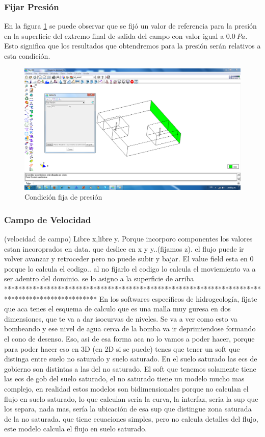 \documentclass[10pt,a4paper,final]{article}
\begin{document}
\subsubsection*{Fijar Presión}
En la figura \ref{datos_condiciones_ransol_presion} se puede observar que se fijó un valor de referencia para la presión en la superficie del extremo final de salida del campo con valor igual a $0.0~Pa$. Esto significa que los resultados que obtendremos para la presión serán relativos a esta condición.

\begin{figure}[tbhp]
\centerline{\includegraphics[scale=0.75]{img/datos_condiciones_ransol_presion}}
\caption{Condición fija de presión}
\label{datos_condiciones_ransol_presion}
\end{figure}

\subsubsection*{Campo de Velocidad}

(velocidad de campo) Libre x,libre y. Porque incorporo componentes los valores estan incoroprados en data.
que deslice en x y y..(fijamos z).
el flujo puede ir volver avanzar y retroceder pero no puede subir y bajar. El value field esta en 0 porque lo calcula el codigo.. al no fijarlo el codigo lo calcula
el moviemiento va a ser adentro del dominio. se lo asigno  a la superficie de arriba
**************************************************************************************************
En los softwares específicos de hidrogeología, fijate que aca tenes el esquema de calculo que es una malla muy guresa en dos dimensiones, que te va a dar isocurvas de niveles. Se va a ver como esto va bombeando y ese nivel de agua cerca de la bomba va ir deprimiendose formando el cono de desenso. Eso, asi de esa forma aca no lo vamos a poder hacer, porque para poder hacer eso en 3D (en 2D si se puede) tenes que tener un soft que distinga entre suelo no saturado y suelo saturado. En el suelo saturado las ecs de gobierno son distintas a las del no saturado. El soft que tenemos solamente tiene las ecs de gob del suelo saturado, el no saturado tiene un modelo mucho mas complejo, en realidad estos modelos son bidimensionales porque no calculan el flujo en suelo saturado, lo que calculan seria la curva, la interfaz, seria la sup que los separa, nada mas, sería la ubicación de esa sup que distingue zona saturada de la no saturada. que tiene ecuaciones simples, pero no calcula detalles del flujo, este modelo calcula el flujo en suelo saturado. 
\end{document}
